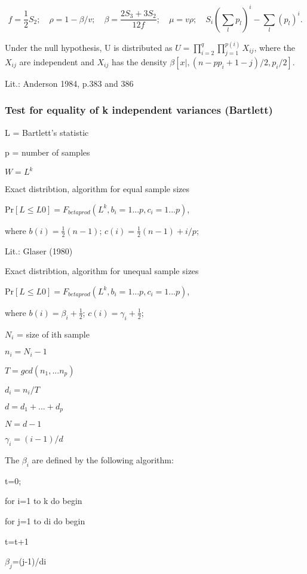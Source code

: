 \begin{equation}
	f=\frac{1}{2}S_2; \quad \rho=1-\beta/v; \quad \beta=\frac{2S_3+3S_2}{12f}; \quad \mu=v \rho; \quad S_i (\sum_l p_l)^i - \sum_l (p_l)^i.
\end{equation}

Under the null hypothesis, U is distributed as $U = \prod_{i=2}^q \prod_{j=1}^{p(i)} X_{ij}$, where the $X_{ij}$ are independent and $X_{ij}$ has the density $\beta[x|,(n-pp_i+1-j)/2,p_i/2]$.

Lit.:	Anderson 1984, p.383 and 386






\subsubsection{Test for equality of k independent variances (Bartlett)}

L = Bartlett's statistic

p = number of samples

$W = L^k$

\vpara
Exact distribtion, algorithm for equal sample sizes

Pr$[L \leq L0] = F_{betaprod}(L^k,b_i=1...p,c_i=1...p)$,

where $b(i)=\tfrac{1}{2}(n-1)$;   $c(i)=\tfrac{1}{2}(n-1)+i/p$;

Lit.: Glaser (1980)


\vpara
Exact distribtion, algorithm for unequal sample sizes

Pr$[L \leq L0] = F_{betaprod}(L^k,b_i=1...p,c_i=1...p)$,

where $b(i)=\beta_i + \tfrac{1}{2}$;   $c(i)=\gamma_i + \tfrac{1}{2}$;

$N_i$ = size of ith sample

$n_i = N_i-1$

$T  = gcd(n_1,...n_p)$

$d_i = n_i/T$

$d  = d_1 + ... + d_p$

$N  = d-1$

$\gamma_i=(i-1)/d$


\vpara
The $\beta_i$ are defined by the following algorithm:

t=0;

for i=1 to k do begin

for j=1 to di do begin

t=t+1

$\beta_j$=(j-1)/di

